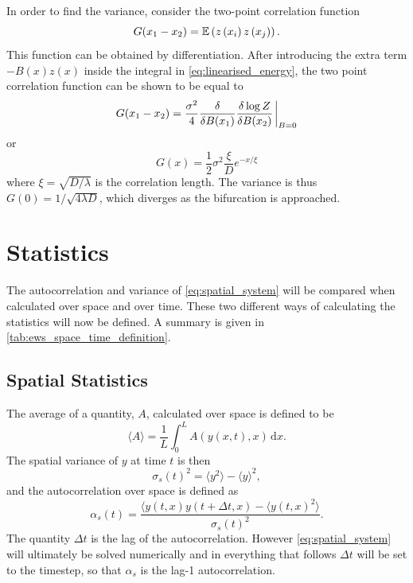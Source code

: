 In order to find the variance, consider the two-point correlation function
\begin{equation}
  \label{eq:two_point_corr}
  G(x_1 - x_2) = \operatorname*{\mathbb{E}} \left(z\left(x_i\right)z\left(x_j\right)\right).
\end{equation}
This function can be obtained by differentiation. After introducing the extra term $-B(x)z(x)$ inside the integral in \cref{eq:linearised_energy}, the two point correlation function
can be shown \parencite{Goldenfeld1992} to be equal to
\begin{equation}
  \label{eq:two_point_from_partition}
  G(x_1-x_2) = \frac{\sigma^2}{4}\fdv{B(x_1)}\fdv{\log Z}{B(x_2)} \eval_{B=0}
\end{equation}
or
\begin{equation}
  \label{eq:two_point_correlation_actual}
  G(x) = \frac{1}{2} \sigma^2 \frac{\xi}{D} e^{-x/\xi}
\end{equation}
where $\xi = \sqrt{D/\lambda}$ is the correlation length. The variance is thus $G(0) = 1/\sqrt{4\lambda D}$, which diverges as the bifurcation is approached.
\section{Statistics}
The autocorrelation and variance of \cref{eq:spatial_system} will be compared when calculated over space and over time. These two different ways of calculating the statistics  will now
be defined. A summary is given in \cref{tab:ews_space_time_definition}.

\subsection{Spatial Statistics}

The average of a quantity, $A$, calculated over space is defined to be
\begin{equation}
  \label{eq:definition_of_average}
  \langle A \rangle = \frac{1}{L}\int_0^L A(y(x,t),x) \,\mathrm{d}x.
\end{equation}
The spatial variance of $y$ at time $t$ is then
\begin{equation}
  \label{eq:spatial_variance}
  \sigma_s(t)^2 = \langle y^2 \rangle - \langle y \rangle^2,
\end{equation}
and the autocorrelation over space is defined as
\begin{equation}
  \label{eq:spatial_autocorrelation}
  \alpha_s(t) = \frac{\langle y(t,x)y(t+\Delta t,x) - \langle y(t,x)^2 \rangle }{\sigma_s(t)^2}.
\end{equation}
The quantity $\Delta t$ is the lag of the autocorrelation. However \cref{eq:spatial_system} will ultimately be solved numerically and
in everything that follows $\Delta t$ will be set to the timestep, so that $\alpha_s$ is the lag-1 autocorrelation.

